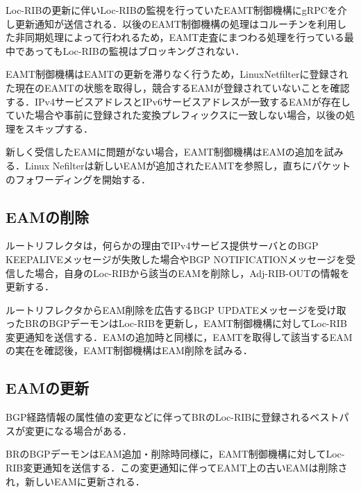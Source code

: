 Loc-RIBの更新に伴いLoc-RIBの監視を行っていたEAMT制御機構にgRPCを介し更新通知が送信される．以後のEAMT制御機構の処理はコルーチンを利用した非同期処理によって行われるため，EAMT走査にまつわる処理を行っている最中であってもLoc-RIBの監視はブロッキングされない．

EAMT制御機構はEAMTの更新を滞りなく行うため，LinuxNetfilterに登録された現在のEAMTの状態を取得し，競合するEAMが登録されていないことを確認する．IPv4サービスアドレスとIPv6サービスアドレスが一致するEAMが存在していた場合や事前に登録された変換プレフィックスに一致しない場合，以後の処理をスキップする．

新しく受信したEAMに問題がない場合，EAMT制御機構はEAMの追加を試みる．Linux Nefilterは新しいEAMが追加されたEAMTを参照し，直ちにパケットのフォワーディングを開始する．

\subsection{EAMの削除}
ルートリフレクタは，何らかの理由でIPv4サービス提供サーバとのBGP KEEPALIVEメッセージが失敗した場合やBGP NOTIFICATIONメッセージを受信した場合，自身のLoc-RIBから該当のEAMを削除し，Adj-RIB-OUTの情報を更新する．

ルートリフレクタからEAM削除を広告するBGP UPDATEメッセージを受け取ったBRのBGPデーモンはLoc-RIBを更新し，EAMT制御機構に対してLoc-RIB変更通知を送信する．EAMの追加時と同様に，EAMTを取得して該当するEAMの実在を確認後，EAMT制御機構はEAM削除を試みる．

\subsection{EAMの更新}
BGP経路情報の属性値の変更などに伴ってBRのLoc-RIBに登録されるベストパスが変更になる場合がある．

BRのBGPデーモンはEAM追加・削除時同様に，EAMT制御機構に対してLoc-RIB変更通知を送信する．この変更通知に伴ってEAMT上の古いEAMは削除され，新しいEAMに更新される．




